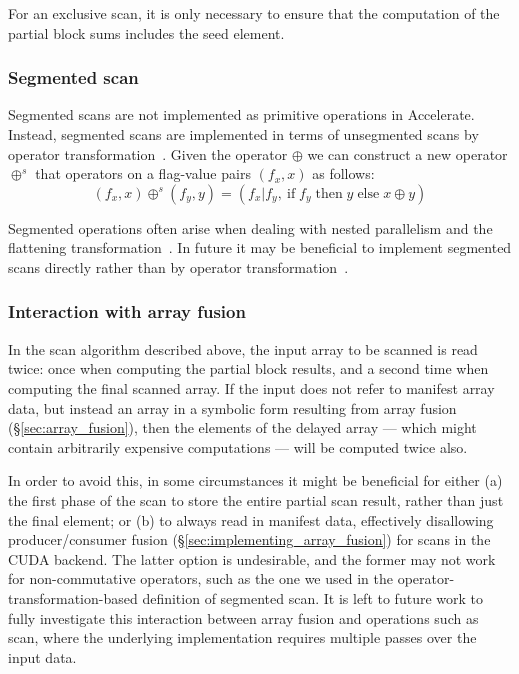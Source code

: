 For an exclusive scan, it is only necessary to ensure that the computation of
the partial block sums includes the seed element.


\subsubsection{Segmented scan}

Segmented scans are not implemented as primitive operations in Accelerate.
Instead, segmented scans are implemented in terms of unsegmented scans by
operator transformation~\cite{Schwartz:1980cy,Blelloch:1990ts}. Given the
operator $\oplus$ we can construct a new operator $\oplus^s$ that operators on a
flag-value pairs $\left( f_x, x \right)$ as follows:
%
\begin{equation*}
    \left( f_x, x \right) \oplus^s \left( f_y, y \right)
        = \left( f_x | f_y,\:\mathrm{if}\;f_y\;\mathrm{then}\;y\;\mathrm{else}\;x\oplus y \right)
\end{equation*}

Segmented operations often arise when dealing with nested parallelism and the
flattening transformation~\cite{Blelloch:1995ut}. In future it may be beneficial
to implement segmented scans directly rather than by operator
transformation~\cite{Sengupta:2008ut,Dotsenko:2008fo}.


\subsubsection{Interaction with array fusion}

In the scan algorithm described above, the input array to be scanned is read
twice: once when computing the partial block results, and a second time when
computing the final scanned array. If the input does not refer to manifest array
data, but instead an array in a symbolic form resulting from array fusion
(\S\ref{sec:array_fusion}), then the elements of the delayed array --- which
might contain arbitrarily expensive computations --- will be computed twice
also.

In order to avoid this, in some circumstances it might be beneficial for either
(a) the first phase of the scan to store the entire partial scan result, rather
than just the final element; or (b) to always read in manifest data, effectively
disallowing producer/consumer fusion (\S\ref{sec:implementing_array_fusion}) for
scans in the CUDA backend. The latter option is undesirable, and the former may
not work for non-commutative operators, such as the one we used in the
operator-transformation-based definition of segmented scan. It is left to future
work to fully investigate this interaction between array fusion and operations
such as scan, where the underlying implementation requires multiple passes over
the input data.

